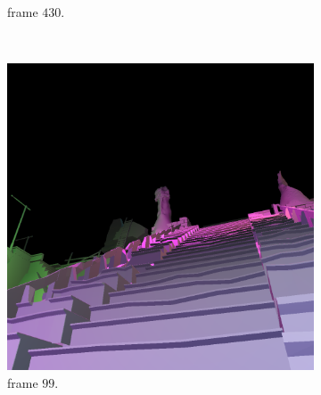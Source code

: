 \begin{figure}[tb]
\begin{subfigure}[b]{0.32\textwidth}
    \caption{frame $430$.}
    \label{fig:fds-test-frames-example:si:430}
  \end{subfigure}\\
  \caption{ Spaceship Indoor frames waarbij het aantal fragmenten \'e\'en
            benadert. }
  \label{fig:fds-test-frames-example:si}
  \vspace{4pt}
  \begin{subfigure}[b]{0.32\textwidth}
    \includegraphics[width=\textwidth]{./img/raw/fds-test-frames-example/zc_99.png}
    \caption{frame $99$.}
    \vspace{2pt}
    \label{fig:fds-test-frames-example:zc:99}
  \end{subfigure}\quad %
  \begin{subfigure}[b]{0.32\textwidth}

\end{subfigure}
\end{figure}
